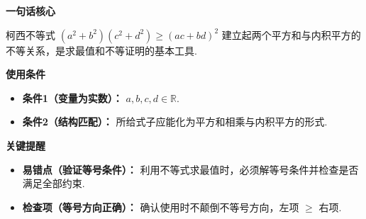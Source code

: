 \begin{summarybox}
	\textbf{\textcolor{CSummary}{一句话核心}}

	柯西不等式 $(a^{2}+b^{2})(c^{2}+d^{2})\ge(ac+bd)^{2}$ 建立起两个平方和与内积平方的不等关系，是求最值和不等证明的基本工具.

	\medskip
	\textbf{\textcolor{CSummary}{使用条件}}
	\begin{itemize}[leftmargin=*, itemsep=0.5em, topsep=0.4em]
		\item \textbf{条件1（变量为实数）：} $a,b,c,d\in\mathbb{R}$.
		\item \textbf{条件2（结构匹配）：} 所给式子应能化为平方和相乘与内积平方的形式.
	\end{itemize}

	\medskip
	\textbf{\textcolor{CSummary}{关键提醒}}
	\begin{itemize}[leftmargin=*, itemsep=0.5em, topsep=0.4em]
		\item \textbf{易错点（验证等号条件）：} 利用不等式求最值时，必须解等号条件并检查是否满足全部约束.
		\item \textbf{检查项（等号方向正确）：} 确认使用时不颠倒不等号方向，左项 $\ge$ 右项.
	\end{itemize}
\end{summarybox}